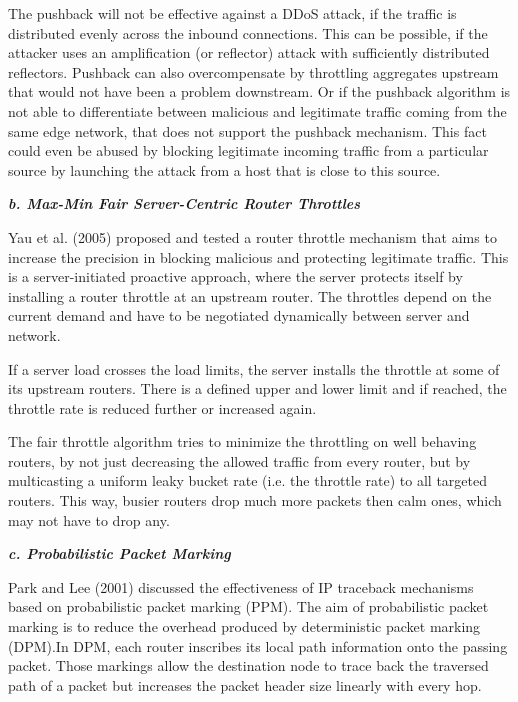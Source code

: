 The pushback will not be effective against a DDoS attack, if the traffic is distributed evenly across the inbound connections. This can be possible, if the attacker uses an amplification (or reflector) attack with sufficiently distributed reflectors. Pushback can also overcompensate by throttling aggregates upstream that would not have been a problem downstream. Or if the pushback algorithm is not able to differentiate between malicious and legitimate traffic coming from the same edge network, that does not support the pushback mechanism. This fact could even be abused by blocking legitimate incoming traffic from a particular source by launching the attack from a host that is close to this source. \cite{Mahajan02}

\textbf{\textit{b. Max-Min Fair Server-Centric Router Throttles}}

Yau et al. (2005) proposed and tested a router throttle mechanism that aims to increase the precision in blocking malicious and protecting legitimate traffic. This is a server-initiated proactive approach, where the server protects itself by installing a router throttle at an upstream router. The throttles depend on the current demand and have to be negotiated dynamically between server and network. \cite{Yau05}

If a server load crosses the load limits, the server installs the throttle at some of its upstream routers. There is a defined upper and lower limit and if reached, the throttle rate is reduced further or increased again. \cite{Yau05}

The fair throttle algorithm tries to minimize the throttling on well behaving routers, by not just decreasing the allowed traffic from every router, but by multicasting a uniform leaky bucket rate (i.e. the throttle rate) to all targeted routers. This way, busier routers drop much more packets then calm ones, which may not have to drop any. \cite{Yau05}

\textbf{\textit{c. Probabilistic Packet Marking}}

Park and Lee (2001) discussed the effectiveness of IP traceback mechanisms based on probabilistic packet marking (PPM). The aim of probabilistic packet marking is to reduce the overhead produced by deterministic packet marking (DPM).In DPM, each router inscribes its local path information onto the passing packet. Those markings allow the destination node to trace back the traversed path of a packet but increases the packet header size linearly with every hop. \cite{Park01}

